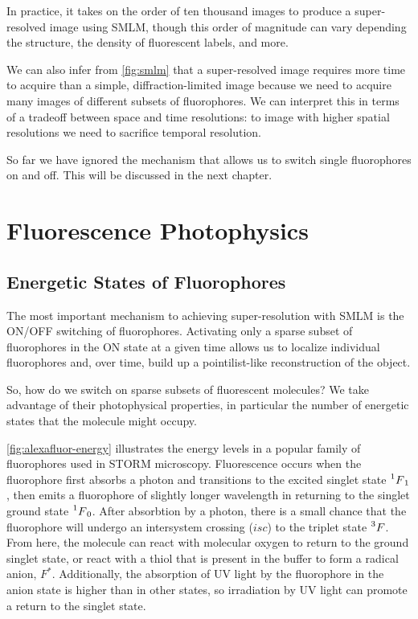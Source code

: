\documentclass[10pt,a4paper]{book}
\begin{document}
In practice, it takes on the order of ten thousand images to produce a super-resolved image using SMLM, though this order of magnitude can vary depending the structure, the density of fluorescent labels, and more.

We can also infer from \autoref{fig:smlm} that a super-resolved image requires more time to acquire than a simple, diffraction-limited image because we need to acquire many images of different subsets of fluorophores. We can interpret this in terms of a tradeoff between space and time resolutions: to image with higher spatial resolutions we need to sacrifice temporal resolution.

So far we have ignored the mechanism that allows us to switch single fluorophores on and off. This will be discussed in the next chapter.

\chapter{Fluorescence Photophysics}

\section{Energetic States of Fluorophores}

The most important mechanism to achieving super-resolution with SMLM is the ON/OFF switching of fluorophores. Activating only a sparse subset of fluorophores in the ON state at a given time allows us to localize individual fluorophores and, over time, build up a pointilist-like reconstruction of the object.

So, how do we switch on sparse subsets of fluorescent molecules? We take advantage of their photophysical properties, in particular the number of energetic states that the molecule might occupy.

\autoref{fig:alexafluor-energy} illustrates the energy levels in a popular family of fluorophores used in STORM microscopy. Fluorescence occurs when the fluorophore first absorbs a photon and transitions to the excited singlet state $\prescript{1}{}F_1$, then emits a fluorophore of slightly longer wavelength in returning to the singlet ground state $\prescript{1}{}F_0$. After absorbtion by a photon, there is a small chance that the fluorophore will undergo an intersystem crossing ($isc$) to the triplet state $\prescript{3}{}F$. From here, the molecule can react with molecular oxygen to return to the ground singlet state, or react with a thiol that is present in the buffer to form a radical anion, $F^*$. Additionally, the absorption of UV light by the fluorophore in the anion state is higher than in other states, so irradiation by UV light can promote a return to the singlet state.
\end{document}

